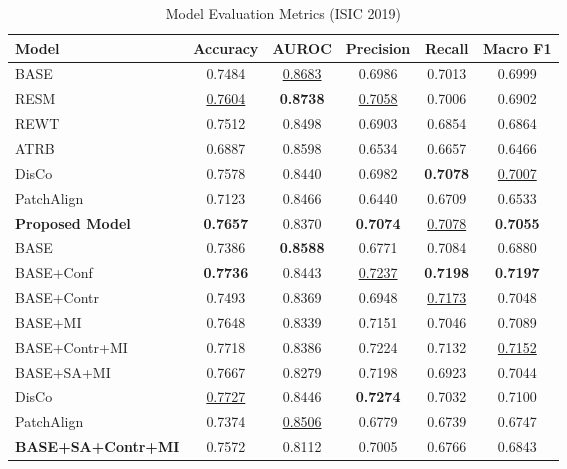 \begin{table}[h]
\centering
\caption{Model Evaluation Metrics (ISIC 2019)}
\label{tab:isic_model_metrics}
\begin{tabular}{|l|c|c|c|c|c|}
\hline
Model & Accuracy & AUROC & Precision & Recall & Macro F1 \\
\hline
BASE & 0.7484 & \underline{0.8683} & 0.6986 & 0.7013 & 0.6999 \\
RESM & \underline{0.7604} & \textbf{0.8738} & \underline{0.7058} & 0.7006 & 0.6902 \\
REWT & 0.7512 & 0.8498 & 0.6903 & 0.6854 & 0.6864 \\
ATRB & 0.6887 & 0.8598 & 0.6534 & 0.6657 & 0.6466 \\
DisCo & 0.7578 & 0.8440 & 0.6982 & \textbf{0.7078} & \underline{0.7007} \\
PatchAlign & 0.7123 & 0.8466 & 0.6440 & 0.6709 & 0.6533 \\
\textbf{Proposed Model} & \textbf{0.7657} & 0.8370 & \textbf{0.7074} & \underline{0.7078} & \textbf{0.7055} \\
\hline
BASE & 0.7386 & \textbf{0.8588} & 0.6771 & 0.7084 & 0.6880 \\
BASE+Conf & \textbf{0.7736} & 0.8443 & \underline{0.7237} & \textbf{0.7198} & \textbf{0.7197} \\
BASE+Contr & 0.7493 & 0.8369 & 0.6948 & \underline{0.7173} & 0.7048 \\
BASE+MI & 0.7648 & 0.8339 & 0.7151 & 0.7046 & 0.7089 \\
BASE+Contr+MI & 0.7718 & 0.8386 & 0.7224 & 0.7132 & \underline{0.7152} \\
BASE+SA+MI & 0.7667 & 0.8279 & 0.7198 & 0.6923 & 0.7044 \\
DisCo & \underline{0.7727} & 0.8446 & \textbf{0.7274} & 0.7032 & 0.7100 \\
PatchAlign & 0.7374 & \underline{0.8506} & 0.6779 & 0.6739 & 0.6747 \\
\textbf{BASE+SA+Contr+MI} & 0.7572 & 0.8112 & 0.7005 & 0.6766 & 0.6843 \\
\hline
\end{tabular}
\end{table}
